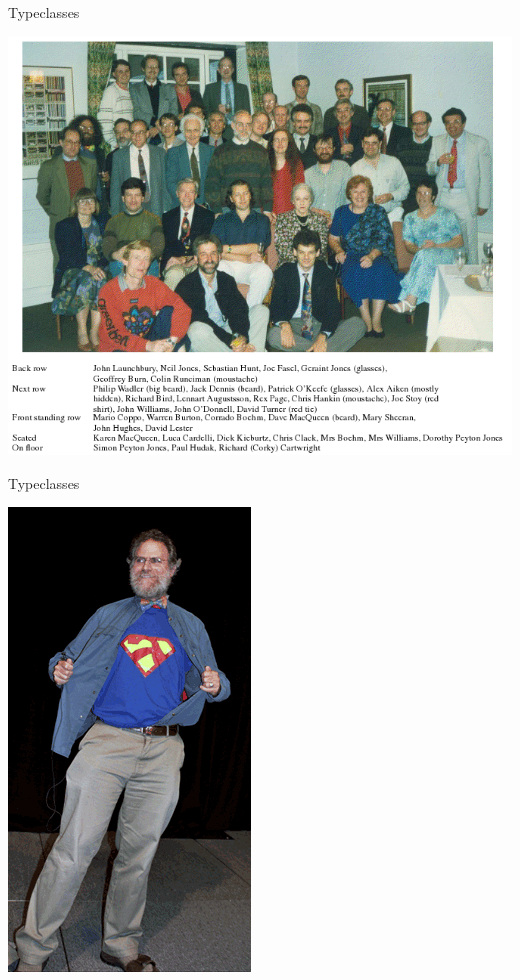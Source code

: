 \documentclass{beamer}
\begin{document}
\begin{frame}[fragile]{Typeclasses}
  \begin{center}
    \includegraphics[scale=0.5]{img/haskell-com}\newline
  \end{center}
\end{frame}

\begin{frame}[fragile]{Typeclasses}
  \begin{center}
    \includegraphics[scale=0.5]{img/wadler}\newline
  \end{center}
\end{frame}
\end{document}
